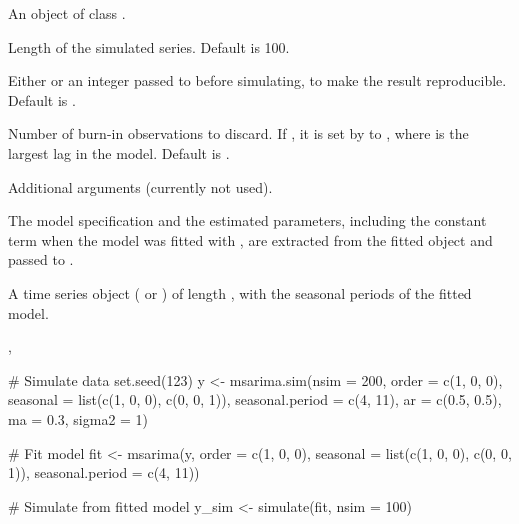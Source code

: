 \documentclass[a4paper]{book}
\begin{document}
%
\begin{Arguments}
\begin{ldescription}
\item[\code{object}] An object of class .

\item[\code{nsim}] Length of the simulated series. Default is 100.

\item[\code{seed}] Either  or an integer passed to 
before simulating, to make the result reproducible. Default is .

\item[\code{burn}] Number of burn-in observations to discard. If , it is set by
 to , where  is the
largest lag in the model. Default is .

\item[\code{...}] Additional arguments (currently not used).
\end{ldescription}
\end{Arguments}
%
\begin{Details}
The model specification and the estimated parameters, including the constant term when
the model was fitted with , are extracted from the fitted
object and passed to .
\end{Details}
%
\begin{Value}
A time series object ( or ) of length , with the
seasonal periods of the fitted model.
\end{Value}
%
\begin{SeeAlso}
, 
\end{SeeAlso}
%
\begin{Examples}
\begin{ExampleCode}
# Simulate data
set.seed(123)
y <- msarima.sim(nsim = 200,
                 order = c(1, 0, 0),
                 seasonal = list(c(1, 0, 0), c(0, 0, 1)),
                 seasonal.period = c(4, 11),
                 ar = c(0.5, 0.5), ma = 0.3, sigma2 = 1)

# Fit model
fit <- msarima(y, order = c(1, 0, 0),
               seasonal = list(c(1, 0, 0), c(0, 0, 1)),
               seasonal.period = c(4, 11))

# Simulate from fitted model
y_sim <- simulate(fit, nsim = 100)

\end{ExampleCode}
\end{Examples}
\printindex{}
\end{document}
